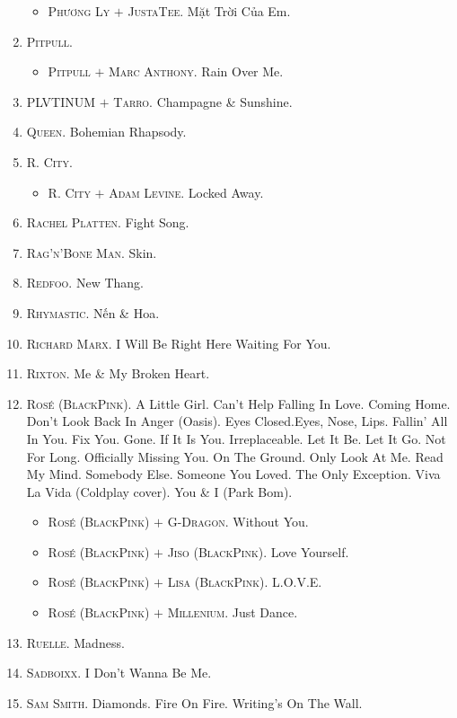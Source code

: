 \documentclass{article}
\numberwithin{equation}{section}
\begin{document}
\begin{enumerate}
\begin{itemize}
		\item \textsc{Phương Ly $+$ JustaTee.} Mặt Trời Của Em.
	\end{itemize}
	\item \textsc{Pitpull.}
	\begin{itemize}
		\item \textsc{Pitpull $+$ Marc Anthony.} Rain Over Me.
	\end{itemize}
	\item \textsc{PLVTINUM $+$ Tarro.} Champagne \& Sunshine.
	\item \textsc{Queen.} Bohemian Rhapsody.
	\item \textsc{R. City.}
	\begin{itemize}
		\item \textsc{R. City $+$ Adam Levine.} Locked Away.
	\end{itemize}
	\item \textsc{Rachel Platten.} Fight Song.
	\item \textsc{Rag'n'Bone Man.} Skin.
	\item \textsc{Redfoo.} New Thang.
	\item \textsc{Rhymastic.} Nến \& Hoa.
	\item \textsc{Richard Marx.} I Will Be Right Here Waiting For You.
	\item \textsc{Rixton.} Me \& My Broken Heart.
	\item \textsc{Ros\'e (BlackPink).} A Little Girl. Can't Help Falling In Love. Coming Home. Don't Look Back In Anger (Oasis). Eyes Closed.Eyes, Nose, Lips. Fallin' All In You. Fix You. Gone. If It Is You. Irreplaceable. Let It Be. Let It Go. Not For Long. Officially Missing You. On The Ground. Only Look At Me. Read My Mind. Somebody Else. Someone You Loved. The Only Exception. Viva La Vida (Coldplay cover). You \& I (Park Bom).
	\begin{itemize}
		\item \textsc{Ros\'e (BlackPink) $+$ G-Dragon.} Without You.
		\item \textsc{Ros\'e (BlackPink) $+$ Jiso (BlackPink).} Love Yourself.
		\item \textsc{Ros\'e (BlackPink) $+$ Lisa (BlackPink).} L.O.V.E.
		\item \textsc{Ros\'e (BlackPink) $+$ Millenium.} Just Dance.
	\end{itemize}
	\item \textsc{Ruelle.} Madness.
	\item \textsc{Sadboixx.} I Don't Wanna Be Me.
	\item \textsc{Sam Smith.} Diamonds. Fire On Fire. Writing's On The Wall.

\end{enumerate}
\end{document}
